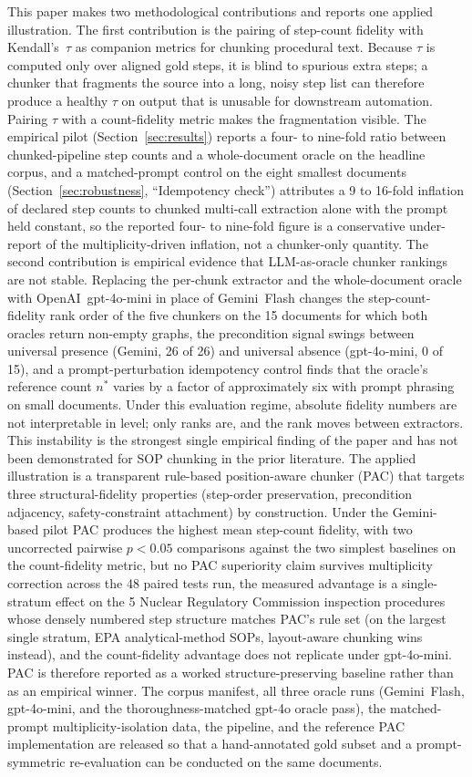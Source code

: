 \documentclass[make,article,submit,oneauthor,pdftex]{Definitions/mdpi}
\begin{document}
This paper makes two methodological contributions and reports one
applied illustration. The first contribution is the pairing of
step-count fidelity with Kendall's~$\tau$ as companion metrics for
chunking procedural text. Because $\tau$ is computed only over aligned
gold steps, it is blind to spurious extra steps; a chunker that
fragments the source into a long, noisy step list can therefore
produce a healthy $\tau$ on output that is unusable for downstream
automation. Pairing $\tau$ with a count-fidelity metric makes the
fragmentation visible. The empirical pilot
(Section~\ref{sec:results}) reports a four- to nine-fold ratio between
chunked-pipeline step counts and a whole-document oracle on the
headline corpus, and a matched-prompt control on the eight smallest
documents (Section~\ref{sec:robustness}, ``Idempotency check'')
attributes a 9 to 16-fold inflation of declared step counts to chunked
multi-call extraction alone with the prompt held constant, so the
reported four- to nine-fold figure is a conservative under-report of
the multiplicity-driven inflation, not a chunker-only quantity.
The second contribution is empirical evidence that LLM-as-oracle
chunker rankings are not stable. Replacing the per-chunk extractor and
the whole-document oracle with OpenAI~gpt-4o-mini in place of
Gemini~Flash changes the step-count-fidelity rank order of the five
chunkers on the 15 documents for which both oracles return non-empty
graphs, the precondition signal swings between universal presence
(Gemini, 26 of 26) and universal absence (gpt-4o-mini, 0 of 15), and a
prompt-perturbation idempotency control finds that the oracle's
reference count $n^{*}$ varies by a factor of approximately six with
prompt phrasing on small documents. Under this evaluation regime,
absolute fidelity numbers are not interpretable in level; only ranks
are, and the rank moves between extractors. This instability is the
strongest single empirical finding of the paper and has not been
demonstrated for SOP chunking in the prior literature. The applied
illustration is a transparent rule-based position-aware chunker (PAC)
that targets three structural-fidelity properties (step-order
preservation, precondition adjacency, safety-constraint attachment) by
construction. Under the Gemini-based pilot PAC produces the highest
mean step-count fidelity, with two uncorrected pairwise $p<0.05$
comparisons against the two simplest baselines on the count-fidelity
metric, but no PAC superiority claim survives multiplicity correction
across the 48 paired tests run, the measured advantage is a
single-stratum effect on the 5 Nuclear Regulatory Commission inspection
procedures whose densely numbered step structure matches PAC's rule
set (on the largest single stratum, EPA analytical-method SOPs,
layout-aware chunking wins instead), and the count-fidelity advantage
does not replicate under gpt-4o-mini. PAC is therefore reported as a
worked structure-preserving baseline rather than as an empirical
winner. The corpus manifest, all three oracle runs (Gemini~Flash,
gpt-4o-mini, and the thoroughness-matched gpt-4o oracle pass), the
matched-prompt multiplicity-isolation data, the pipeline, and the
reference PAC implementation are released so that a hand-annotated
gold subset and a prompt-symmetric re-evaluation can be conducted on
the same documents.
\end{document}
